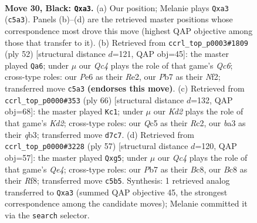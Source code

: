 \documentclass[11pt]{article}
\begin{document}
\clearpage

\begin{figure}[p]\centering
\begin{subfigure}{0.46\textwidth}\centering
\resizebox{\linewidth}{!}{%
\newchessgame
\chessboard[
  setfen={r1b1r3/1p1k1p1R/2n1p1Q1/pBq1P3/P4P2/B7/4K3/6N1 b - - 1 30},
  showmover=false,
  pgfstyle=straightmove, color=movearrow, markmove={c5-a3}
]}
\caption{}
\end{subfigure}\hfill
\begin{subfigure}{0.46\textwidth}\centering
\resizebox{\linewidth}{!}{%
\newchessgame
\chessboard[
  setfen={2r3k1/5p1p/2Q1b1p1/8/pq1r4/1P1B4/P3RNP1/1R3K2 w - - 2 27},
  showmover=false,
  pgfstyle=straightmove, color=movearrow, markmove={c6-a6}
]}
\caption{}
\end{subfigure}
\\[4pt]
\begin{subfigure}{0.46\textwidth}\centering
\resizebox{\linewidth}{!}{%
\newchessgame
\chessboard[
  setfen={3rk3/5r2/4p1QB/p4p1P/1b2bR2/1qNP4/1PRK4/8 w - - 5 34},
  showmover=false,
  pgfstyle=straightmove, color=movearrow, markmove={d2-c1}
]}
\caption{}
\end{subfigure}\hfill
\begin{subfigure}{0.46\textwidth}\centering
\resizebox{\linewidth}{!}{%
\newchessgame
\chessboard[
  setfen={r1b2r2/pp4k1/6n1/3Rq1Q1/2p3pP/6N1/P3BpP1/5K1R b - - 4 29},
  showmover=false,
  pgfstyle=straightmove, color=movearrow, markmove={e5-g5}
]}
\caption{}
\end{subfigure}
\caption{\textbf{Move 30, Black: \texttt{Qxa3}.} (a) Our position; Melanie plays \texttt{Qxa3} (\texttt{c5a3}). Panels (b)--(d) are the retrieved master positions whose correspondence most drove this move (highest QAP objective among those that transfer to it). (b) Retrieved from \texttt{ccrl\_top\_p0003\#1809} (ply 52) [structural distance $d$=121, QAP obj=45]: the master played \texttt{Qa6}; under $\mu$ our \emph{Qc4} plays the role of that game's \emph{Qc6}; cross-type roles: our \emph{P}e6 as their \emph{R}e2, our \emph{P}b7 as their \emph{N}f2; transferred move \texttt{c5a3} \textbf{(endorses this move)}. (c) Retrieved from \texttt{ccrl\_top\_p0000\#353} (ply 66) [structural distance $d$=132, QAP obj=68]: the master played \texttt{Kc1}; under $\mu$ our \emph{Kd2} plays the role of that game's \emph{Kd2}; cross-type roles: our \emph{Q}c5 as their \emph{R}c2, our \emph{b}a3 as their \emph{q}b3; transferred move \texttt{d7c7}. (d) Retrieved from \texttt{ccrl\_top\_p0000\#3228} (ply 57) [structural distance $d$=120, QAP obj=57]: the master played \texttt{Qxg5}; under $\mu$ our \emph{Qc4} plays the role of that game's \emph{Qe4}; cross-type roles: our \emph{P}b7 as their \emph{B}c8, our \emph{B}c8 as their \emph{R}f8; transferred move \texttt{c5b5}. Synthesis: 1 retrieved analog transferred to \texttt{Qxa3} (summed QAP objective 45, the strongest correspondence among the candidate moves); Melanie committed it via the \texttt{search} selector.}
\label{fig:thought-m59}
\end{figure}
\end{document}
